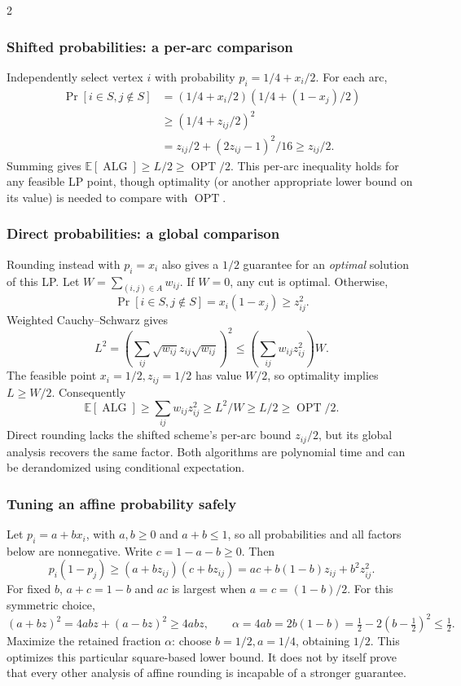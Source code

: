\documentclass[10pt]{article}
\theoremstyle{definition}
\newcommand{\OPT}{\operatorname{OPT}}
\newcommand{\ALG}{\operatorname{ALG}}
\begin{document}
\begin{multicols*}{2}
\subsubsection*{Shifted probabilities: a per-arc comparison}
Independently select vertex $i$ with probability $p_i=1/4+x_i/2$.
For each arc,
\[
  \begin{aligned}
    \Pr[i\in S,j\notin S]
      &=(1/4+x_i/2)(1/4+(1-x_j)/2)\\
      &\ge(1/4+z_{ij}/2)^2\\
      &=z_{ij}/2+(2z_{ij}-1)^2/16\ge z_{ij}/2.
  \end{aligned}
\]
Summing gives $\mathbb E[\ALG]\ge L/2\ge\OPT/2$.
This per-arc inequality holds for any feasible LP point, though optimality
(or another appropriate lower bound on its value) is needed to compare
with $\OPT$.

\subsubsection*{Direct probabilities: a global comparison}
Rounding instead with $p_i=x_i$ also gives a $1/2$ guarantee for an
\emph{optimal} solution of this LP. Let $W=\sum_{(i,j)\in A}w_{ij}$.
If $W=0$, any cut is optimal. Otherwise,
\[
  \Pr[i\in S,j\notin S]=x_i(1-x_j)\ge z_{ij}^2.
\]
Weighted Cauchy--Schwarz gives
\[
  L^2=\left(\sum_{ij}\sqrt{w_{ij}}z_{ij}\sqrt{w_{ij}}\right)^2
    \le\left(\sum_{ij}w_{ij}z_{ij}^2\right)W.
\]
The feasible point $x_i=1/2,z_{ij}=1/2$ has value $W/2$, so optimality
implies $L\ge W/2$. Consequently
\[
  \mathbb E[\ALG]\ge\sum_{ij}w_{ij}z_{ij}^2
    \ge L^2/W\ge L/2\ge\OPT/2.
\]
Direct rounding lacks the shifted scheme's per-arc bound $z_{ij}/2$,
but its global analysis recovers the same factor. Both algorithms are
polynomial time and can be derandomized using conditional expectation.

\subsubsection*{Tuning an affine probability safely}
Let $p_i=a+bx_i$, with $a,b\ge0$ and $a+b\le1$, so all probabilities and
all factors below are nonnegative. Write $c=1-a-b\ge0$. Then
\[
  p_i(1-p_j)\ge(a+bz_{ij})(c+bz_{ij})
    =ac+b(1-b)z_{ij}+b^2z_{ij}^2.
\]
For fixed $b$, $a+c=1-b$ and $ac$ is largest when
$a=c=(1-b)/2$. For this symmetric choice,
\[
  (a+bz)^2=4abz+(a-bz)^2\ge4abz,
  \qquad
  \alpha=4ab=2b(1-b)=\tfrac12-2(b-\tfrac12)^2\le\tfrac12.
\]
Maximize the retained fraction $\alpha$: choose $b=1/2,a=1/4$, obtaining
$1/2$. This optimizes this particular square-based lower bound. It does
not by itself prove that every other analysis of affine rounding is
incapable of a stronger guarantee.


\end{multicols*}
\end{document}
